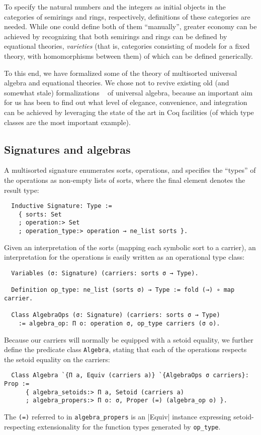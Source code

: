\documentclass[a4paper,10pt,runningheads]{llncs}
\begin{document}
To specify the natural numbers and the integers as initial objects in the categories of semirings and rings, respectively, definitions of these categories are needed. While one could define both of them ``manually'', greater economy can be achieved by recognizing that both semirings and rings can be defined by equational theories, \emph{varieties} (that is, categories consisting of models for a fixed theory, with homomorphisms between them) of which can be defined generically.

To this end, we have formalized some of the theory of multisorted universal algebra and equational theories. We chose not to revive existing old (and somewhat stale) formalizations ~\cite{DBLP:conf/tphol/Capretta99,dominguez2008formalizing} of universal algebra, because an important aim for us has been to find out what level of elegance, convenience, and integration can be achieved by leveraging the state of the art in Coq facilities (of which type classes are the most important example).

\subsection{Signatures and algebras}

A multisorted signature enumerates sorts, operations, and specifies the ``types'' of the operations as non-empty lists of sorts, where the final element denotes the result type:
\begin{lstlisting}
  Inductive Signature: Type :=
    { sorts: Set
    ; operation:> Set
    ; operation_type:> operation → ne_list sorts }.
\end{lstlisting}
Given an interpretation of the sorts (mapping each symbolic sort to a carrier), an interpretation for the operations is easily written as an operational type class:
\begin{lstlisting}
  Variables (σ: Signature) (carriers: sorts σ → Type).

  Definition op_type: ne_list (sorts σ) → Type := fold (→) ∘ map carrier.

  Class AlgebraOps (σ: Signature) (carriers: sorts σ → Type)
    := algebra_op: Π o: operation σ, op_type carriers (σ o).
\end{lstlisting}
Because our carriers will normally be equipped with a setoid equality, we further define the predicate class \lstinline|Algebra|, stating that each of the operations respects the setoid equality on the carriers:
\begin{lstlisting}
  Class Algebra `{Π a, Equiv (carriers a)} `{AlgebraOps σ carriers}: Prop :=
      { algebra_setoids:> Π a, Setoid (carriers a)
      ; algebra_propers:> Π o: σ, Proper (=) (algebra_op o) }.
\end{lstlisting}
The \lstinline|(=)| referred to in \lstinline|algebra_propers| is an |Equiv| instance expressing setoid-respecting extensionality for the function types generated by \lstinline|op_type|.
\end{document}
